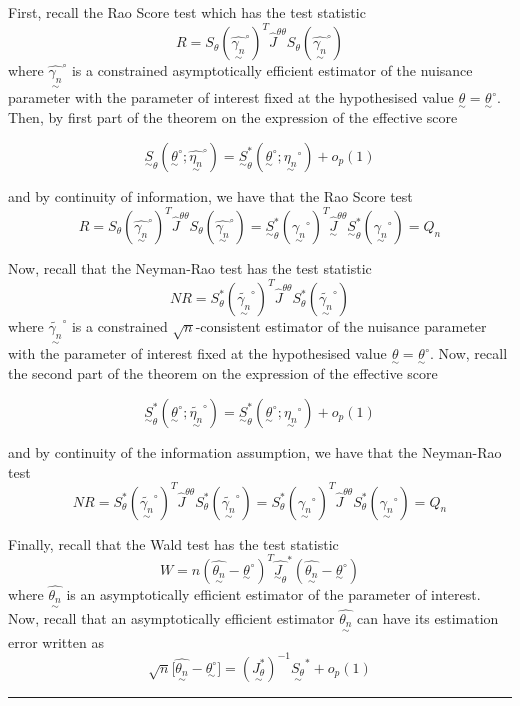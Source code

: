\documentclass[twoside]{article}
\newenvironment{proof}{{\bf Proof:}}{\hfill\rule{2mm}{2mm}}
\newcommand{\utilde}{\underset{\sim}}
\begin{document}
\begin{proof} First, recall the Rao Score test which has the test statistic 
$$
R = S_{\theta}(\hat{\utilde{\gamma_n}}^{\circ})^T\hat{J}^{\theta \theta}S_{\theta}(\hat{\utilde{\gamma_n}}^{\circ})
$$
where $\hat{\utilde{\gamma_n}}^{\circ}$ is a constrained asymptotically efficient estimator of the nuisance parameter with the parameter of interest fixed at the hypothesised value $\utilde{\theta} = \utilde{\theta}^{\circ}.$ Then, by first part of the theorem on the expression of the effective score

$$\utilde{S}_{\theta}(\utilde{\theta}^{\circ};\hat{\utilde{\eta_{n}}}^{\circ}) = \utilde{S}_{\theta}^{*}(\utilde{\theta}^{\circ};\utilde{\eta_{n}}^{\circ}) + o_p(1)$$

and by continuity of information, we have that the Rao Score test
\begin{equation}
R = S_{\theta}(\hat{\utilde{\gamma_n}}^{\circ})^T\hat{J}^{\theta \theta}S_{\theta}(\hat{\utilde{\gamma_n}}^{\circ}) = \utilde{S}_{\theta}^{*}(\utilde{\gamma_n}^{\circ})^T\utilde{\hat{J}}^{\theta \theta}\utilde{S}_{\theta}^{*}(\utilde{\gamma_n}^{\circ}) = Q_n
\tag{1}
\end{equation}



Now, recall that the Neyman-Rao test has the test statistic 
$$
NR = S_{\theta}^{*}(\tilde{\utilde{\gamma_n}}^{\circ})^T\hat{J}^{\theta \theta}S_{\theta}^{*}(\tilde{\utilde{\gamma_n}}^{\circ})
$$
where $\tilde{\utilde{\gamma_n}}^{\circ}$ is a constrained $\sqrt{n}$-consistent estimator of the nuisance parameter with the parameter of interest fixed at the hypothesised value $\utilde{\theta} = \utilde{\theta}^{\circ}.$ Now, recall the second part of the theorem on the expression of the effective score

$$\utilde{S}_{\theta}^{*}(\utilde{\theta}^{\circ};\tilde{\utilde{\eta_{n}}}^{\circ}) = \utilde{S}_{\theta}^{*}(\utilde{\theta}^{\circ};\utilde{\eta_{n}}^{\circ}) + o_p(1)$$

and by continuity of the information assumption, we have that the Neyman-Rao test 
\begin{equation}
NR = S_{\theta}^{*}(\tilde{\utilde{\gamma_n}}^{\circ})^T\hat{J}^{\theta \theta}S_{\theta}^{*}(\tilde{\utilde{\gamma_n}}^{\circ}) = S_{\theta}^{*}({\utilde{\gamma_n}}^{\circ})^T\hat{J}^{\theta \theta}S_{\theta}^{*}({\utilde{\gamma_n}}^{\circ}) = Q_n
\tag{2}
\end{equation}

Finally, recall that the Wald test has the test statistic 
$$
W = n(\hat{\utilde{\theta_n}} - \utilde{\theta}^{\circ})^T\hat{\utilde{J}_{\theta}}^{*}(\hat{\utilde{\theta_n}} - \utilde{\theta}^{\circ})
$$
where $\hat{\utilde{\theta_n}}$ is an asymptotically efficient estimator of the parameter of interest. Now, recall that an asymptotically efficient estimator $\hat{\utilde{\theta_n}}$ can have its estimation error written as 
$$
\sqrt{n}\bigg[\hat{\utilde{\theta_n}} - \utilde{\theta^{\circ}} \bigg] = (\utilde{J_{\theta}^{*}})^{-1}\utilde{S_{\theta}}^{*} + o_p(1)
$$


\end{proof}
\end{document}
